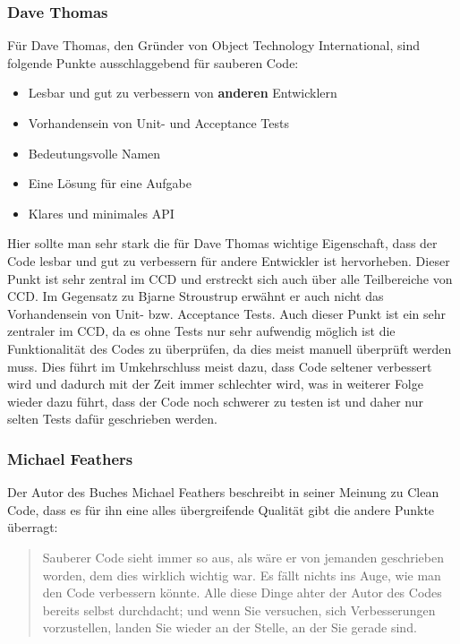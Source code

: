 \subsubsection{Dave Thomas}
Für Dave Thomas, den Gründer von Object Technology International,  sind folgende Punkte ausschlaggebend für sauberen Code:

\begin{itemize}
	\item Lesbar und gut zu verbessern von \textbf{anderen} Entwicklern
	\item Vorhandensein von Unit- und Acceptance Tests
	\item Bedeutungsvolle Namen
	\item Eine Lösung für eine Aufgabe
	\item Klares und minimales API
\end{itemize}

Hier sollte man sehr stark die für Dave Thomas wichtige Eigenschaft, dass der Code lesbar und gut zu verbessern für andere Entwickler ist hervorheben. Dieser Punkt ist sehr zentral im CCD und erstreckt sich auch über alle Teilbereiche von CCD. Im Gegensatz zu Bjarne Stroustrup erwähnt er auch nicht das Vorhandensein von Unit- bzw. Acceptance Tests. Auch dieser Punkt ist ein sehr zentraler im CCD, da es ohne Tests nur sehr aufwendig möglich ist die Funktionalität des Codes zu überprüfen, da dies meist manuell überprüft werden muss. Dies führt im Umkehrschluss meist dazu, dass Code seltener verbessert wird und dadurch mit der Zeit immer schlechter wird, was in weiterer Folge wieder dazu führt, dass der Code noch schwerer zu testen ist und daher nur selten Tests dafür geschrieben werden. 

\subsubsection{Michael Feathers}
Der Autor des Buches \cite{Feathers2013} Michael Feathers beschreibt in seiner Meinung zu Clean Code, dass es für ihn eine alles übergreifende Qualität gibt die andere Punkte überragt: 

\begin{quotation}
	Sauberer Code sieht immer so aus, als wäre er von jemanden geschrieben worden, dem dies wirklich wichtig war. Es fällt nichts ins Auge, wie man den Code verbessern könnte. Alle diese Dinge ahter der Autor des Codes bereits selbst durchdacht; und wenn Sie versuchen, sich Verbesserungen vorzustellen, landen Sie wieder an der Stelle, an der Sie gerade sind.
\end{quotation}

